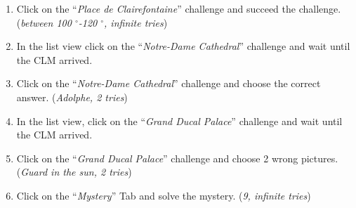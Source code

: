 \begin{enumerate}
	\item Click on the ``\emph{Place de Clairefontaine}'' challenge and succeed the challenge. (\emph{between 100 $^{\circ}$-120 $^{\circ}$, infinite tries})
	\item In the list view click on the ``\emph{Notre-Dame Cathedral}'' challenge and wait until the CLM arrived.
	\item Click on the ``\emph{Notre-Dame Cathedral}'' challenge and choose the correct answer. (\emph{Adolphe, 2 tries})
	\item In the list view, click on the ``\emph{Grand Ducal Palace}'' challenge and wait until the CLM arrived.
	\item Click on the ``\emph{Grand Ducal Palace}'' challenge and choose 2 wrong pictures. (\emph{Guard in the sun, 2 tries})
	\item Click on the ``\emph{Mystery}'' Tab and solve the mystery. (\emph{9, infinite tries})
\end{enumerate}

